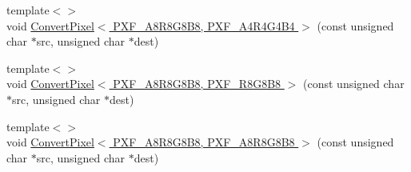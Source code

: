 \begin{DoxyCompactItemize}
\item 
{\footnotesize template$<$$>$ }\\void \hyperlink{_convert_pixel_8inl_a2b0f640950df7166465be83a229a6176}{Convert\+Pixel$<$ P\+X\+F\+\_\+\+A8\+R8\+G8\+B8, P\+X\+F\+\_\+\+A4\+R4\+G4\+B4 $>$} (const unsigned char $\ast$src, unsigned char $\ast$dest)
\item 
{\footnotesize template$<$$>$ }\\void \hyperlink{_convert_pixel_8inl_af2947ef1a294a4d9eff8fb1affe1372d}{Convert\+Pixel$<$ P\+X\+F\+\_\+\+A8\+R8\+G8\+B8, P\+X\+F\+\_\+\+R8\+G8\+B8 $>$} (const unsigned char $\ast$src, unsigned char $\ast$dest)
\item 
{\footnotesize template$<$$>$ }\\void \hyperlink{_convert_pixel_8inl_aa1d27fcb1c6c3789b977d97697ff7460}{Convert\+Pixel$<$ P\+X\+F\+\_\+\+A8\+R8\+G8\+B8, P\+X\+F\+\_\+\+A8\+R8\+G8\+B8 $>$} (const unsigned char $\ast$src, unsigned char $\ast$dest)
\end{DoxyCompactItemize}


